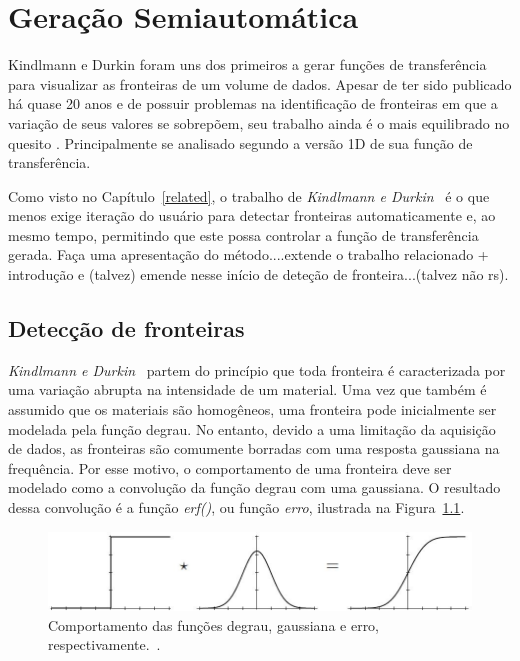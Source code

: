 
\chapter{Geração Semiautomática}
\label{gordon}

	Kindlmann e Durkin foram uns dos primeiros a gerar funções de transferência para visualizar as fronteiras de um volume de dados. Apesar de ter sido publicado há quase 20 anos e de possuir problemas na identificação de fronteiras em que a variação de seus valores se sobrepõem, seu trabalho ainda é o mais equilibrado no quesito . Principalmente se analisado segundo a versão 1D de sua função de transferência.
	
	
	Como visto no Capítulo~\ref{related}, o trabalho de \textit{Kindlmann e Durkin}~\cite{gordon} é o que menos exige iteração do usuário para detectar fronteiras automaticamente e, ao mesmo tempo, permitindo que este possa controlar a função de transferência gerada.
	Faça uma apresentação do método....extende o trabalho relacionado + introdução e (talvez) emende nesse início de deteção de fronteira...(talvez não rs).
\section{Detecção de fronteiras}
\label{gordon.bound}
	\textit{Kindlmann e Durkin}~\cite{gordon} partem do princípio que toda fronteira é caracterizada por uma variação abrupta na intensidade de um material. Uma vez que também é assumido que os materiais são homogêneos, uma fronteira pode inicialmente ser modelada pela função degrau. No entanto, devido a uma limitação da aquisição de dados, as fronteiras são comumente borradas com uma resposta gaussiana na frequência. Por esse motivo, o comportamento de uma fronteira deve ser modelado como a convolução da função degrau com uma gaussiana. O resultado dessa convolução é a função \textit{erf()}, ou função \textit{erro}, ilustrada na Figura~\ref{fig:boundary_model}.
	
\begin{figure}[h]
	\centering
	\includegraphics[width=1\textwidth]{images/g_boundary_model}
	\caption{Comportamento das funções degrau, gaussiana e erro, respectivamente.~\cite{gordon}.}
	\label{fig:boundary_model}
\end{figure}

